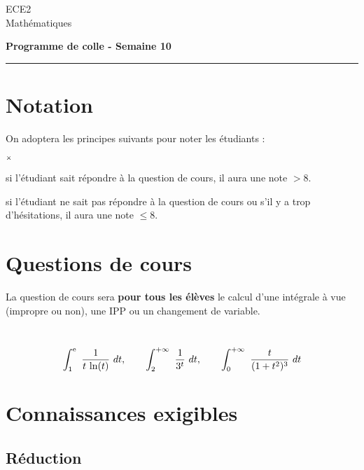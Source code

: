 \documentclass[11pt]{article}%
\begin{document}
\begin{flushleft}
ECE2 \\
Mathématiques
\end{flushleft}


\vspace{0.1cm}

\begin{center}
\textbf{\Large{Programme de colle - Semaine 10}}
\end{center}

\hrule

\vspace*{0,2cm}

\section*{Notation}

\noindent
On adoptera les principes suivants pour noter les étudiants :
\begin{noliste}{$\scriptstyle \times$}
\item si l'étudiant sait répondre à la question de cours, il 
aura une note $>8$.
\item si l'étudiant ne sait pas répondre à la question de 
cours ou s'il y a trop d'hésitations, il aura une note $\leq 8$.
\end{noliste}

\section*{Questions de cours}


\noindent
La question de cours sera {\bf pour tous les élèves} le calcul d'une 
intégrale à vue (impropre ou non), une IPP ou un changement de variable.

\begin{examples}~
 \[
  \displaystyle \int_{1}^{\text{e}}\  \dfrac{1}{t\, \ln(t)} \ dt, \qquad
  \displaystyle \int_{2}^{+\infty}\  \dfrac{1}{3^t} \ dt, \qquad
  \displaystyle \int_{0}^{+\infty}\  \dfrac{t}{(1+t^2)^3} \ dt
 \]
\end{examples}


\section*{Connaissances exigibles}

\subsection*{Réduction}
\end{document}
